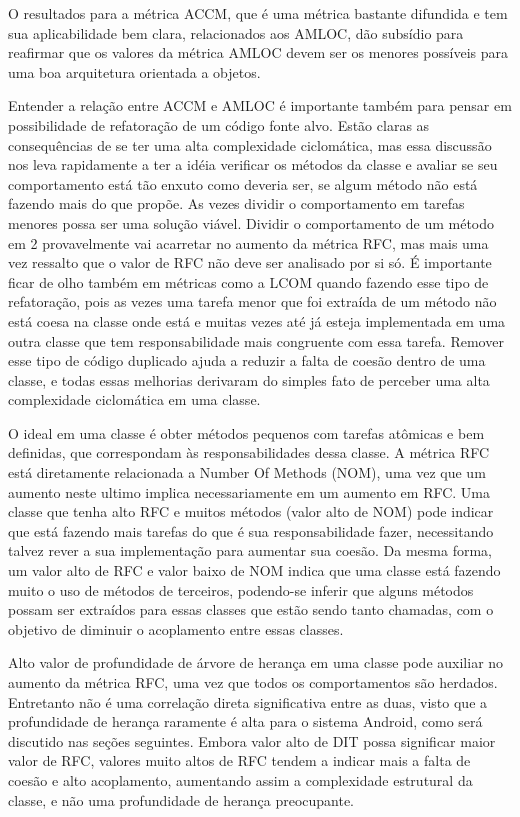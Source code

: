 O resultados para a métrica ACCM, que é uma métrica bastante difundida e tem sua aplicabilidade bem clara, relacionados aos AMLOC, dão subsídio para reafirmar que os valores da métrica AMLOC devem ser os menores possíveis para uma boa arquitetura orientada a objetos.

Entender a relação entre ACCM e AMLOC é importante também para pensar em possibilidade de refatoração de um código fonte alvo. Estão claras as consequências de se ter uma alta complexidade ciclomática, mas essa discussão nos leva rapidamente a ter a idéia verificar os métodos da classe e avaliar se seu comportamento está tão enxuto como deveria ser, se algum método não está fazendo mais do que propõe. As vezes dividir o comportamento em tarefas menores possa ser uma solução viável. Dividir o comportamento de um método em 2 provavelmente vai acarretar no aumento da métrica RFC, mas mais uma vez ressalto que o valor de RFC não deve ser analisado por si só. É importante ficar de olho também em métricas como a LCOM quando fazendo esse tipo de refatoração, pois as vezes uma tarefa menor que foi extraída de um método não está coesa na classe onde está e muitas vezes até já esteja implementada em uma outra classe que tem responsabilidade mais congruente com essa tarefa. Remover esse tipo de código duplicado ajuda a reduzir a falta de coesão dentro de uma classe, e todas essas melhorias derivaram do simples fato de perceber uma alta complexidade ciclomática em uma classe.

O ideal em uma classe é obter métodos pequenos com tarefas atômicas e bem definidas, que correspondam às responsabilidades dessa classe. A métrica RFC está diretamente relacionada a Number Of Methods (NOM), uma vez que um aumento neste ultimo implica necessariamente em um aumento em RFC. Uma classe que tenha alto RFC e muitos métodos (valor alto de NOM) pode indicar que está fazendo mais tarefas do que é sua responsabilidade fazer, necessitando talvez rever a sua implementação para aumentar sua coesão. Da mesma forma, um valor alto de RFC e valor baixo de NOM indica que uma classe está fazendo muito o uso de métodos de terceiros, podendo-se inferir que alguns métodos possam ser extraídos para essas classes que estão sendo tanto chamadas, com o objetivo de diminuir o acoplamento entre essas classes.

Alto valor de profundidade de árvore de herança em uma classe pode auxiliar no aumento da métrica RFC, uma vez que todos os comportamentos são herdados. Entretanto não é uma correlação direta significativa entre as duas, visto que a profundidade de herança raramente é alta para o sistema Android, como será discutido nas seções seguintes. Embora valor alto de DIT possa significar maior valor de RFC, valores muito altos de RFC tendem a indicar mais a falta de coesão e alto acoplamento, aumentando assim a complexidade estrutural da classe, e não uma profundidade de herança preocupante.

